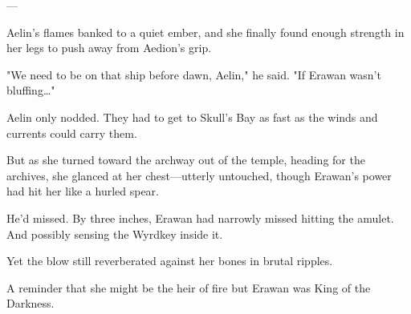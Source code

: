 ---

Aelin's flames banked to a quiet ember, and she finally found enough strength in her legs to push away from Aedion's grip.

"We need to be on that ship before dawn, Aelin," he said. "If Erawan wasn't bluffing\ldots"

Aelin only nodded. They had to get to Skull's Bay as fast as the winds and currents could carry them.

But as she turned toward the archway out of the temple, heading for the archives, she glanced at her chest---utterly untouched, though Erawan's power had hit her like a hurled spear.

He'd missed. By three inches, Erawan had narrowly missed hitting the amulet. And possibly sensing the Wyrdkey inside it.

Yet the blow still reverberated against her bones in brutal ripples.

A reminder that she might be the heir of fire  but Erawan was King of the Darkness.
